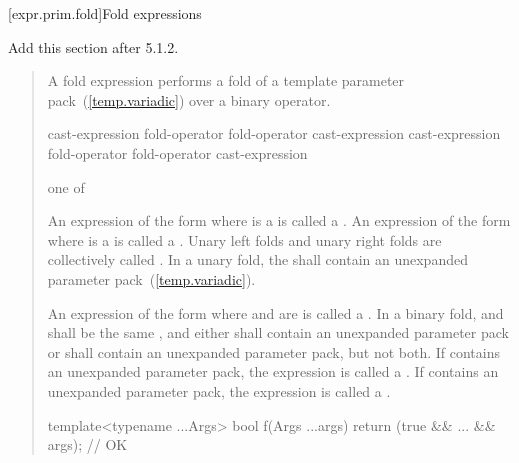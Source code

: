 [expr.prim.fold]{Fold expressions}

Add this section after 5.1.2.

\begin{quote}

\pnum
A fold expression performs a fold of a template parameter
pack~(\ref{temp.variadic}) over a binary operator.

\begin{bnf}
\br
    \terminal{(} cast-expression fold-operator  \terminal{)}\br
    \terminal{(}  fold-operator cast-expression \terminal{)}\br
    \terminal{(} cast-expression fold-operator  fold-operator cast-expression \terminal{)}
\end{bnf}

\begin{bnf}
 \textnormal{one of}\br
    \terminal{+ }\quad\terminal{- }\quad\terminal{* }\quad\terminal{/ }\quad\terminal{\% }\quad\terminal{\^{} }\quad\terminal{\& }\quad\terminal{| }\quad\terminal{\shl\ }\quad\terminal{\shr }\br
    \terminal{+=}\quad\terminal{-=}\quad\terminal{*=}\quad\terminal{/=}\quad\terminal{\%=}\quad\terminal{\^{}=}\quad\terminal{\&=}\quad\terminal{|=}\quad\terminal{\shl=}\quad\terminal{\shr=}\quad\terminal{=}\br
    \terminal{==}\quad\terminal{!=}\quad\terminal{< }\quad\terminal{> }\quad\terminal{<=}\quad\terminal{>=}\quad\terminal{\&\&}\quad\terminal{||}\quad\terminal{,  }\quad{}\quad\terminal{->*}
\end{bnf}

\pnum
An expression of the form
  
where  is a 
is called a .
An expression of the form
  
where  is a 
is called a .
Unary left folds and unary right folds
are collectively called .
In a unary fold,
the 
shall contain an unexpanded parameter pack~(\ref{temp.variadic}).

\pnum
An expression of the form
    
where  and  are 
is called a .
In a binary fold,
 and 
shall be the same ,
and either 
shall contain an unexpanded parameter pack
or 
shall contain an unexpanded parameter pack,
but not both.
If  contains an unexpanded parameter pack,
the expression is called a .
If  contains an unexpanded parameter pack,
the expression is called a .
\enterexample
\begin{codeblock}
template<typename ...Args>
bool f(Args ...args) {
  return (true && ... && args); // OK
}


\end{codeblock}
\end{quote}
